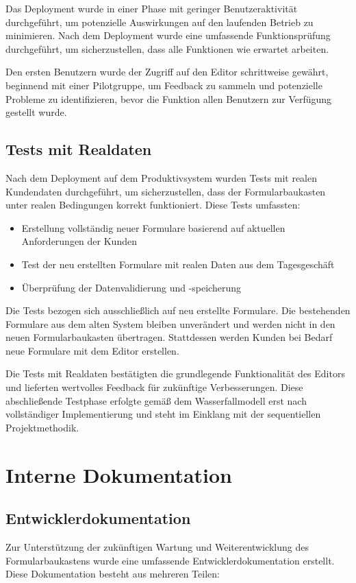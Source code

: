 \documentclass[a4paper,11pt]{article}
\begin{document}
\noindent Das Deployment wurde in einer Phase mit geringer Benutzeraktivität durchgeführt, um potenzielle Auswirkungen auf den laufenden Betrieb zu minimieren. Nach dem Deployment wurde eine umfassende Funktionsprüfung durchgeführt, um sicherzustellen, dass alle Funktionen wie erwartet arbeiten.

\noindent Den ersten Benutzern wurde der Zugriff auf den Editor schrittweise gewährt, beginnend mit einer Pilotgruppe, um Feedback zu sammeln und potenzielle Probleme zu identifizieren, bevor die Funktion allen Benutzern zur Verfügung gestellt wurde.

\subsection{Tests mit Realdaten}
Nach dem Deployment auf dem Produktivsystem wurden Tests mit realen Kundendaten durchgeführt, um sicherzustellen, dass der Formularbaukasten unter realen Bedingungen korrekt funktioniert. Diese Tests umfassten:

\begin{itemize}
  \item Erstellung vollständig neuer Formulare basierend auf aktuellen Anforderungen der Kunden
  \item Test der neu erstellten Formulare mit realen Daten aus dem Tagesgeschäft
  \item Überprüfung der Datenvalidierung und -speicherung
\end{itemize}

\noindent Die Tests bezogen sich ausschließlich auf neu erstellte Formulare. Die bestehenden Formulare aus dem alten System bleiben unverändert und werden nicht in den neuen Formularbaukasten übertragen. Stattdessen werden Kunden bei Bedarf neue Formulare mit dem Editor erstellen.

\noindent Die Tests mit Realdaten bestätigten die grundlegende Funktionalität des Editors und lieferten wertvolles Feedback für zukünftige Verbesserungen. Diese abschließende Testphase erfolgte gemäß dem Wasserfallmodell erst nach vollständiger Implementierung und steht im Einklang mit der sequentiellen Projektmethodik.

\section{Interne Dokumentation}
\subsection{Entwicklerdokumentation}
Zur Unterstützung der zukünftigen Wartung und Weiterentwicklung des Formularbaukastens wurde eine umfassende Entwicklerdokumentation erstellt. Diese Dokumentation besteht aus mehreren Teilen:
\end{document}
